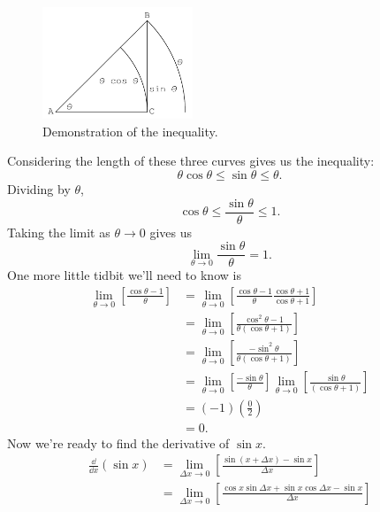 \begin{Solution}
\begin{enumerate}
    \begin{figure}[tbp]
      \begin{center}
        \includegraphics[width=0.4\textwidth]{calculus/differential/sintheta}
      \end{center}
      \caption{Demonstration of the inequality.}
      \label{sintheta}
    \end{figure}

    Considering the length of these three curves
    gives us the inequality:
    \[
    \theta \cos \theta \leq \sin \theta \leq \theta.
    \]
    Dividing by $\theta$,
    \[
    \cos \theta \leq \frac{\sin \theta}{\theta} \leq 1.
    \]
    Taking the limit as $\theta \to 0$ gives us
    \[
    \lim_{\theta \to 0} \frac{\sin \theta}{\theta} = 1.
    \]
    One more little tidbit we'll need to know is
    \begin{align*}
      \lim_{\theta \to 0} \left[ \frac{\cos \theta - 1}{\theta} \right]
      &= \lim_{\theta \to 0} \left[ \frac{\cos \theta - 1}{\theta}
        \frac{\cos \theta + 1}{\cos \theta + 1} \right] \\
      &= \lim_{\theta \to 0} \left[ \frac{\cos^2 \theta - 1}
        {\theta (\cos \theta + 1)} \right] \\
      &= \lim_{\theta \to 0} \left[ \frac{-\sin^2 \theta}
        {\theta (\cos \theta + 1)} \right] \\
      &= \lim_{\theta \to 0} \left[ \frac{-\sin \theta} {\theta} \right]
      \lim_{\theta \to 0} \left[ \frac{\sin \theta}
        {(\cos \theta + 1)} \right] \\
      &= (-1) \left( \frac{0}{2} \right) \\
      &= 0.
    \end{align*}
    Now we're ready to find the derivative of $\sin x$.
    \begin{align*}
      \frac{\dd}{\dd x} (\sin x)
      &= \lim_{\Delta x \to 0} \left[ \frac{\sin(x+\Delta x) - \sin x}
        {\Delta x} \right] \\
      &= \lim_{\Delta x \to 0} \left[ \frac{\cos x \sin \Delta x
          + \sin x \cos \Delta x - \sin x}{\Delta x} \right] \\

\end{align*}
\end{enumerate}
\end{Solution}
